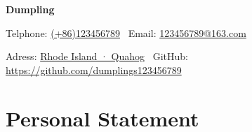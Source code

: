 \documentclass[a4paper,10pt]{article}
\begin{document}
\centerline{\Huge{\bfseries Dumpling}}
\vspace{0.5em}
\centerline{{Telphone: \href{tel:(+86)123456789}{(+86)123456789} 
\textperiodcentered \ Email: \href{mailto:123456789@163.com}{123456789@163.com}}}
\centerline{{Adress: \href{https://ditu.amap.com/search?query=Rhode Island · Quahog}{Rhode Island · Quahog}
\textperiodcentered \ GitHub: \href{https://github.com/dumplings123456789}{https://github.com/dumplings123456789}}}
\hfill {}

\section*{Personal Statement}
 
\subsection*{}
\subsection*{} 
\subsection*{}
\end{document}
